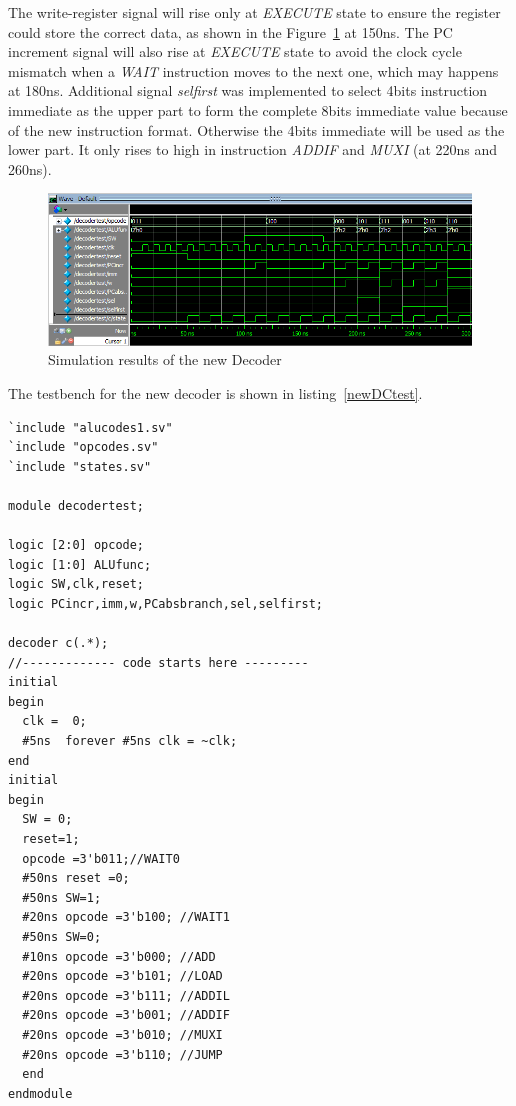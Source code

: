 The write-register signal will rise only at \textit{EXECUTE} state to ensure the register could store the correct data, as shown in the Figure~\ref{fig:newDCtest} at 150ns. The PC increment signal will also rise at \textit{EXECUTE} state to avoid the clock cycle mismatch when a \textit{WAIT} instruction moves to the next one, which may happens at 180ns. Additional signal \textit{selfirst} was implemented to select 4bits instruction immediate as the upper part to form the complete 8bits immediate value because of the new instruction format. Otherwise the 4bits immediate will be used as the lower part. It only rises to high in instruction \textit{ADDIF} and \textit{MUXI} (at 220ns and 260ns). 

\begin{figure}[H]
		\centering
		\includegraphics[width = \textwidth]{Figures/newdecodertest}		
		\caption{Simulation results of the new Decoder}
		\label {fig:newDCtest}
\end{figure}

The testbench for the new decoder is shown in listing~\ref{newDCtest}.

\begin{lstlisting}
`include "alucodes1.sv"
`include "opcodes.sv"
`include "states.sv"

module decodertest;

logic [2:0] opcode;
logic [1:0] ALUfunc;
logic SW,clk,reset;
logic PCincr,imm,w,PCabsbranch,sel,selfirst;

decoder c(.*);
//------------- code starts here ---------
initial
begin
  clk =  0;
  #5ns  forever #5ns clk = ~clk;
end
initial 
begin
  SW = 0;	
  reset=1;
  opcode =3'b011;//WAIT0
  #50ns reset =0; 
  #50ns SW=1;    
  #20ns opcode =3'b100; //WAIT1
  #50ns SW=0;
  #10ns opcode =3'b000; //ADD
  #20ns opcode =3'b101; //LOAD 
  #20ns opcode =3'b111; //ADDIL
  #20ns opcode =3'b001; //ADDIF
  #20ns opcode =3'b010; //MUXI
  #20ns opcode =3'b110; //JUMP  
  end
endmodule 
\end{lstlisting}

